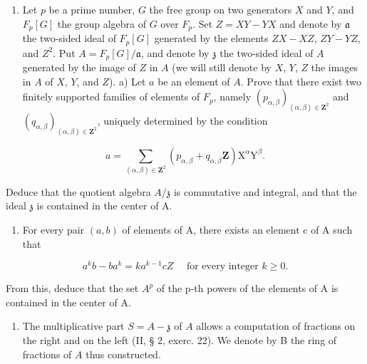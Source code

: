 
\begin{enumerate}
\def\labelenumi{\arabic{enumi})}
\tightlist
\item
  Let \(p\) be a prime number, \(G\) the free group on two generators \(X\) and \(Y\), and \(F_p[G]\) the group algebra of \(G\) over \(F_p\). Set \(Z = XY - YX\) and denote by \(\mathfrak{a}\) the two-sided ideal of \(F_p[G]\) generated by the elements \(ZX - XZ\), \(ZY - YZ\), and \(Z^2\). Put \(A = F_p[G]/\mathfrak{a}\), and denote by \(\mathfrak{z}\) the two-sided ideal of \(A\) generated by the image of \(Z\) in \(A\) (we will still denote by \(X\), \(Y\), \(Z\) the images in \(A\) of \(X\), \(Y\), and \(Z\)). a) Let \(a\) be an element of \(A\). Prove that there exist two finitely supported families of elements of \(F_p\), namely \((p_{\alpha,\beta})_{(\alpha,\beta)\in\mathbf{Z}^2}\) and \((q_{\alpha,\beta})_{(\alpha,\beta)\in\mathbf{Z}^2}\), uniquely determined by the condition
\end{enumerate}

\[
a = \sum_ {(\alpha , \beta) \in \mathbf {Z} ^ {2}} (p _ {\alpha , \beta} + q _ {\alpha , \beta} \mathbf {Z}) \mathrm{X} ^ {\alpha} \mathrm{Y} ^ {\beta}.
\]

Deduce that the quotient algebra \(A/\mathfrak{z}\) is commutative and integral, and that the ideal \(\mathfrak{z}\) is contained in the center of A.

\begin{enumerate}
\def\labelenumi{\alph{enumi})}
\setcounter{enumi}{1}
\tightlist
\item
  For every pair \((a, b)\) of elements of A, there exists an element c of A such that
\end{enumerate}

\[
  a ^ {k} b - b a ^ {k} = k a ^ {k - 1} c Z \quad \text { for every integer } k \geqslant 0.
\]

From this, deduce that the set \(A^{p}\) of the p-th powers of the elements of A is contained in the center of A.

\begin{enumerate}
\def\labelenumi{\alph{enumi})}
\setcounter{enumi}{2}
\tightlist
\item
  The multiplicative part \(S = A - \mathfrak{z}\) of \(A\) allows a computation of fractions on the right and on the left (II, § 2, exerc. 22). We denote by B the ring of fractions of \(A\) thus constructed.
\end{enumerate}

